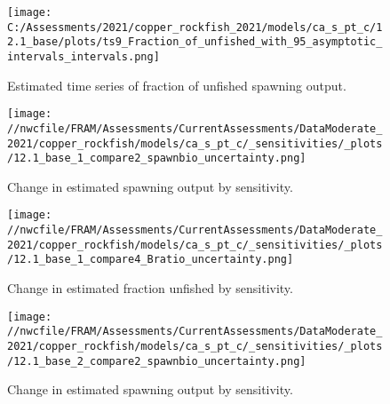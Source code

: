 \documentclass[11pt,
  english,
  a4paper,
]{article}
\begin{document}
\begin{figure}
\centering
\texttt{[image: C:/Assessments/2021/copper\_rockfish\_2021/models/ca\_s\_pt\_c/12.1\_base/plots/ts9\_Fraction\_of\_unfished\_with\_95\_asymptotic\_intervals\_intervals.png]}
\caption{Estimated time series of fraction of unfished spawning output.\label{fig:depl}}
\end{figure}

\tagmcend\tagstructend


\begin{figure}
\centering
\texttt{[image: //nwcfile/FRAM/Assessments/CurrentAssessments/DataModerate\_2021/copper\_rockfish/models/ca\_s\_pt\_c/\_sensitivities/\_plots/12.1\_base\_1\_compare2\_spawnbio\_uncertainty.png]}
\caption{Change in estimated spawning output by sensitivity.\label{fig:sens-ssb-1}}
\end{figure}

\tagmcend\tagstructend


\begin{figure}
\centering
\texttt{[image: //nwcfile/FRAM/Assessments/CurrentAssessments/DataModerate\_2021/copper\_rockfish/models/ca\_s\_pt\_c/\_sensitivities/\_plots/12.1\_base\_1\_compare4\_Bratio\_uncertainty.png]}
\caption{Change in estimated fraction unfished by sensitivity.\label{fig:sens-depl-1}}
\end{figure}

\tagmcend\tagstructend


\begin{figure}
\centering
\texttt{[image: //nwcfile/FRAM/Assessments/CurrentAssessments/DataModerate\_2021/copper\_rockfish/models/ca\_s\_pt\_c/\_sensitivities/\_plots/12.1\_base\_2\_compare2\_spawnbio\_uncertainty.png]}
\caption{Change in estimated spawning output by sensitivity.\label{fig:sens-ssb-2}}
\end{figure}

\tagmcend\tagstructend

\end{document}

